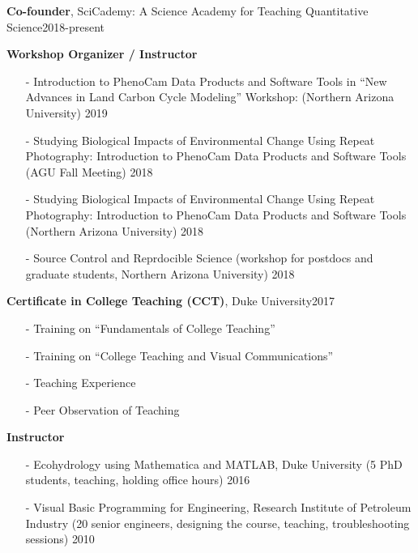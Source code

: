 \documentclass[10pt]{article}
\newenvironment{changemargin}[2]{%
  \begin{list}{}{%
 \setlength{\topsep}{0pt}%
 \setlength{\leftmargin}{#1}%
 \setlength{\rightmargin}{#2}%
 \setlength{\listparindent}{\parindent}%
 \setlength{\itemindent}{\parindent}%
 \setlength{\parsep}{\parskip}%
  }%
  \item[]}{\end{list}
}
\newenvironment{body} {
  \vspace*{-2pt}
  \begin{changemargin}{-0.5in}{-0.5in}
}
{\end{changemargin}
}
\begin{document}
\begin{body}

  \textbf{Co-founder}, SciCademy: A Science Academy for Teaching Quantitative Science\hfill {2018-present}\\
  \medskip

  \textbf {Workshop Organizer / Instructor}\\
  \vspace*{-4pt}
  \begin{itemize} \itemsep -0pt
    \item[-] Introduction to PhenoCam Data Products and Software Tools in ``New Advances in Land Carbon Cycle Modeling'' Workshop:  (Northern Arizona University)  \hfill {2019} \smallskip
    \item[-] Studying Biological Impacts of Environmental Change Using Repeat Photography: Introduction to PhenoCam Data Products and Software Tools (AGU Fall Meeting)  \hfill {2018}\smallskip
    \item[-] Studying Biological Impacts of Environmental Change Using Repeat Photography: Introduction to PhenoCam Data Products and Software Tools (Northern Arizona University)  \hfill {2018}\smallskip
    \item[-] Source Control and Reprdocible Science (workshop for postdocs and graduate students, Northern Arizona University)  \hfill {2018}\smallskip
  \end{itemize}
  \medskip

  \textbf{Certificate in College Teaching (CCT)}, Duke University\hfill {2017}\\
  \vspace*{-4pt}
  \begin{itemize} \itemsep -0pt
    \item[-]Training on ``Fundamentals of College Teaching''\\
    \item[-]Training on ``College Teaching and Visual Communications''\\
    \item[-]Teaching Experience
    \item[-]Peer Observation of Teaching \\
  \end{itemize}
  \medskip


  \textbf {Instructor}\\
  \vspace*{-4pt}
  \begin{itemize} \itemsep -0pt
    \item[-]Ecohydrology using Mathematica and MATLAB, Duke University (5 PhD students, teaching, holding office hours) \hfill {2016}
    \item[-]Visual Basic Programming for Engineering, Research Institute of Petroleum Industry (20 senior engineers, designing the course, teaching,  troubleshooting sessions)  \hfill {2010}
  \end{itemize}
  \medskip


\end{body}
\end{document}
